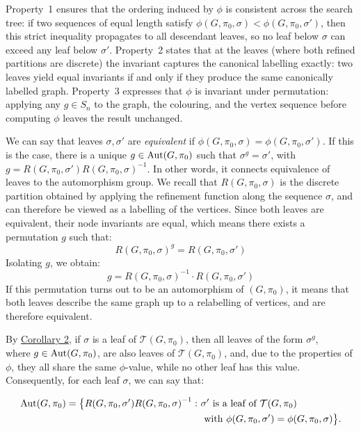 {\sloppy
Property~1 ensures that the ordering induced by $\phi$ is consistent across the search tree: if two sequences of equal length satisfy $\phi(G,\pi_0,\sigma) < \phi(G,\pi_0,\sigma')$, then this strict inequality propagates to all descendant leaves, so no leaf below $\sigma$ can exceed any leaf below $\sigma'$. Property~2 states that at the leaves (where both refined partitions are discrete) the invariant captures the canonical labelling exactly: two leaves yield equal invariants if and only if they produce the same canonically labelled graph. Property~3 expresses that $\phi$ is invariant under permutation: applying any $g \in S_n$ to the graph, the colouring, and the vertex sequence before computing $\phi$ leaves the result unchanged.}

We can say that leaves $\sigma, \sigma'$ are \textit{equivalent} if  $\phi(G,\pi_0, \sigma) = \phi(G,\pi_0, \sigma')$. If this is the case, there is a unique $g \mathrel{\in}\operatorname{Aut} (G, \pi_0)$ such that $\sigma^g  = \sigma'$, with $g = R (G,\pi_0, \sigma') R {(G,\pi_0, \sigma)}^{-1}$. In other words, it connects equivalence of leaves to the automorphism group. We recall that $R(G, \pi_0, \sigma)$ is the discrete partition obtained by applying the refinement function along the sequence $\sigma$, and can therefore be viewed as a labelling of the vertices. Since both leaves are equivalent, their node invariants are equal, which means there exists a permutation $g$ such that:
\[R{(G, \pi_0, \sigma)}^g = R(G, \pi_0, \sigma')\]
Isolating $g$, we obtain:
\[g = R{(G, \pi_0, \sigma)}^{-1} \cdot R(G, \pi_0, \sigma')\]
If this permutation turns out to be an automorphism of $(G, \pi_0)$, it means that both leaves describe the same graph up to a relabelling of vertices, and are therefore equivalent.

By \hyperref[cor: Corollary]{Corollary 2}, if $\sigma$ is a leaf of $\mathcal{T}(G,\pi_0)$, then all leaves of the form $\sigma^g$,\\ where $g\in\operatorname{Aut}(G,\pi_0)$, are also leaves of $\mathcal{T}(G,\pi_0)$, and, due to the properties of $\phi$, they all share the same $\phi$-value, while no other leaf has this value. Consequently, for each leaf $\sigma$, we can say that:


\begin{align*}
\Aut(G,\pi_0) = \big\{R(G,\pi_0, \sigma')R{(G,\pi_0, \sigma)}^{-1} :\ &\sigma' \text{ is a leaf of } \mathcal{T}(G,\pi_0) \\
&\text{ with } \phi(G,\pi_0, \sigma') = \phi(G,\pi_0, \sigma)\big\}.
\end{align*}



